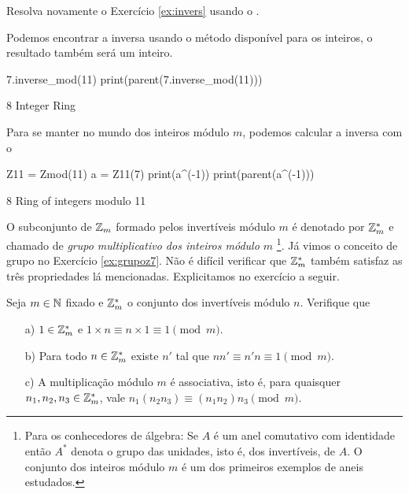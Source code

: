 \begin{exercise}
  Resolva novamente o Exercício \ref{ex:invers}
  usando o . 
\end{exercise}

Podemos encontrar a inversa usando o método 
disponível para os inteiros, o resultado também será
um inteiro.
\begin{sageinput}
7.inverse_mod(11)
print(parent(7.inverse_mod(11)))
\end{sageinput}
\begin{sageoutput}
8
Integer Ring
\end{sageoutput}
Para se manter no mundo dos inteiros módulo $m$,
podemos calcular a inversa com o 
\begin{sageinput}
Z11 = Zmod(11)
a = Z11(7)
print(a^(-1))
print(parent(a^(-1)))
\end{sageinput}
\begin{sageoutput}
8
Ring of integers modulo 11
\end{sageoutput}

O subconjunto de $\mathbb{Z}_m$ formado pelos invertíveis módulo $m$ é
denotado por $\mathbb{Z}_m^\ast$ e chamado de \emph{grupo multiplicativo dos
inteiros módulo $m$}
\footnote{Para os conhecedores de álgebra: Se $A$ é um anel
comutativo com identidade
então $A^\ast$ denota o grupo das unidades, isto é, dos invertíveis,
de $A$. O conjunto dos inteiros módulo $m$ é um dos primeiros
exemplos de aneis estudados.}. Já vimos o conceito de grupo
no Exercício \ref{ex:grupoz7}. Não é difícil verificar que
$\mathbb{Z}_m^\ast$ também satisfaz as três propriedades lá mencionadas.
Explicitamos no exercício a seguir.

\begin{exercise}
  Seja $m  \in \mathbb{N}$ fixado e $\mathbb{Z}_m^\ast$ o conjunto dos
  invertíveis módulo $n$.  Verifique que 
  \begin{itemize}
    \item[a)] $1 \in \mathbb{Z}_m^\ast$ e $1\times n \equiv n \times 1 \equiv 1
        \pmod m$.
    \item[b)] Para todo $n \in \mathbb{Z}_m^\ast$ existe $n'$ tal que
    $nn' \equiv n'n \equiv 1 \pmod m$.
    \item[c)] A  multiplicação módulo $m$ é associativa, isto é,
    para quaisquer $n_1,n_2,n_3 \in \mathbb{Z}_m^*$, vale $n_1(n_2n_3)
    \equiv (n_1n_2)n_3 \pmod m$. 
  \end{itemize}
\end{exercise}

